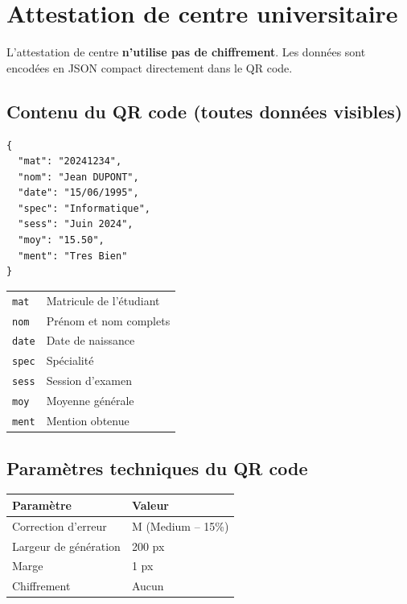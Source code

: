 \documentclass[a4paper,11pt]{article}
\begin{document}
\section{Attestation de centre universitaire}

L'attestation de centre \textbf{n'utilise pas de chiffrement}. Les donn\'ees sont encod\'ees en JSON compact directement dans le QR code.

\subsection{Contenu du QR code (toutes donn\'ees visibles)}

\begin{tcolorbox}[colback=blue!5, colframe=sectionblue, title={\textbf{7 champs -- Toutes les donn\'ees visibles en clair}}]
\begin{lstlisting}
{
  "mat": "20241234",
  "nom": "Jean DUPONT",
  "date": "15/06/1995",
  "spec": "Informatique",
  "sess": "Juin 2024",
  "moy": "15.50",
  "ment": "Tres Bien"
}
\end{lstlisting}

\begin{longtable}{p{3cm}p{9.5cm}}
\texttt{mat} & Matricule de l'\'etudiant \\
\texttt{nom} & Pr\'enom et nom complets \\
\texttt{date} & Date de naissance \\
\texttt{spec} & Sp\'ecialit\'e \\
\texttt{sess} & Session d'examen \\
\texttt{moy} & Moyenne g\'en\'erale \\
\texttt{ment} & Mention obtenue \\
\end{longtable}
\end{tcolorbox}

\subsection{Param\`etres techniques du QR code}

\begin{center}
\begin{tabular}{ll}
\toprule
\textbf{Param\`etre} & \textbf{Valeur} \\
\midrule
Correction d'erreur & M (Medium -- 15\%) \\
Largeur de g\'en\'eration & 200 px \\
Marge & 1 px \\
Chiffrement & Aucun \\
\bottomrule
\end{tabular}
\end{center}
\end{document}
